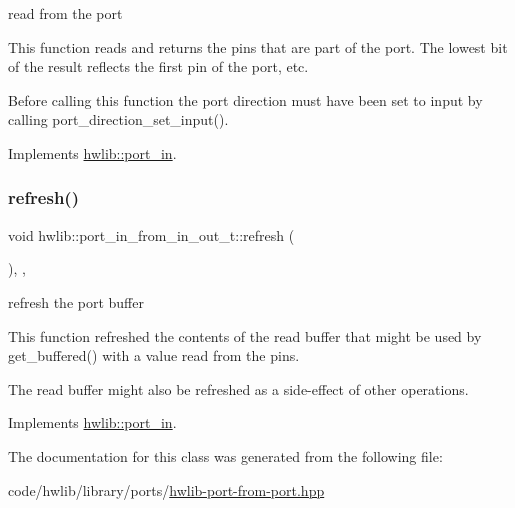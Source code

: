 read from the port

This function reads and returns the pins that are part of the port. The lowest bit of the result reflects the first pin of the port, etc.

Before calling this function the port direction must have been set to input by calling port\+\_\+direction\+\_\+set\+\_\+input(). 

Implements \hyperlink{classhwlib_1_1port__in_aa3aa277f9448c3ee493c56f05beb2ddb}{hwlib\+::port\+\_\+in}.

\mbox{\label{classhwlib_1_1port__in__from__in__out__t_a0f499254dadfe9f8306b03b7b7a90d9f}} 
\subsubsection{\texorpdfstring{refresh()}{refresh()}}
{\footnotesize\ttfamily void hwlib\+::port\+\_\+in\+\_\+from\+\_\+in\+\_\+out\+\_\+t\+::refresh (\begin{DoxyParamCaption}{ }\end{DoxyParamCaption})\hspace{0.3cm}{\ttfamily [inline]}, {\ttfamily [override]}, {\ttfamily [virtual]}}





refresh the port buffer

This function refreshed the contents of the read buffer that might be used by get\+\_\+buffered() with a value read from the pins.

The read buffer might also be refreshed as a side-\/effect of other operations. 

Implements \hyperlink{classhwlib_1_1port__in_a5d409eee35b766c844f7229fbe010545}{hwlib\+::port\+\_\+in}.



The documentation for this class was generated from the following file\+:\begin{DoxyCompactItemize}
\item 
code/hwlib/library/ports/\hyperlink{hwlib-port-from-port_8hpp}{hwlib-\/port-\/from-\/port.\+hpp}\end{DoxyCompactItemize}
